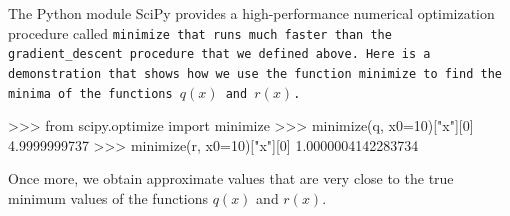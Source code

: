 			The Python module SciPy %
			provides a high-performance numerical optimization procedure called \tt{minimize}
			that runs much faster than the \tt{gradient\_descent} procedure that we defined above.
			Here is a demonstration that shows how we use the function \tt{minimize}
			to find the minima of the functions $q(x)$ and $r(x)$. %

			\begin{codeblock}
			>>> from scipy.optimize import minimize
			>>> minimize(q, x0=10)["x"][0]
			4.9999999737
			>>> minimize(r, x0=10)["x"][0]
			1.0000004142283734
			\end{codeblock}

			\noindent
			Once more,
			we obtain approximate values
			that are very close to the true minimum values of the functions $q(x)$ and $r(x)$.





